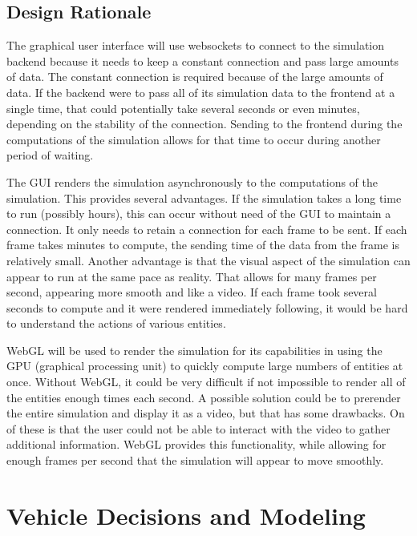 \documentclass[onecolumn, draftclsnofoot,10pt, compsoc]{IEEEtran}
\begin{document}
\subsection{Design Rationale}
The graphical user interface will use websockets to connect to the simulation backend because it needs to keep a constant connection and pass large amounts of data.
The constant connection is required because of the large amounts of data.
If the backend were to pass all of its simulation data to the frontend at a single time, that could potentially take several seconds or even minutes, depending on the stability of the connection.
Sending to the frontend during the computations of the simulation allows for that time to occur during another period of waiting.

The GUI renders the simulation asynchronously to the computations of the simulation.
This provides several advantages.
If the simulation takes a long time to run (possibly hours), this can occur without need of the GUI to maintain a connection.
It only needs to retain a connection for each frame to be sent.
If each frame takes minutes to compute, the sending time of the data from the frame is relatively small.
Another advantage is that the visual aspect of the simulation can appear to run at the same pace as reality.
That allows for many frames per second, appearing more smooth and like a video.
If each frame took several seconds to compute and it were rendered immediately following, it would be hard to understand the actions of various entities.

WebGL will be used to render the simulation for its capabilities in using the GPU (graphical processing unit) to quickly compute large numbers of entities at once.
Without WebGL, it could be very difficult if not impossible to render all of the entities enough times each second.
A possible solution could be to prerender the entire simulation and display it as a video, but that has some drawbacks.
On of these is that the user could not be able to interact with the video to gather additional information.
WebGL provides this functionality, while allowing for enough frames per second that the simulation will appear to move smoothly.
\section{Vehicle Decisions and Modeling}
\end{document}
